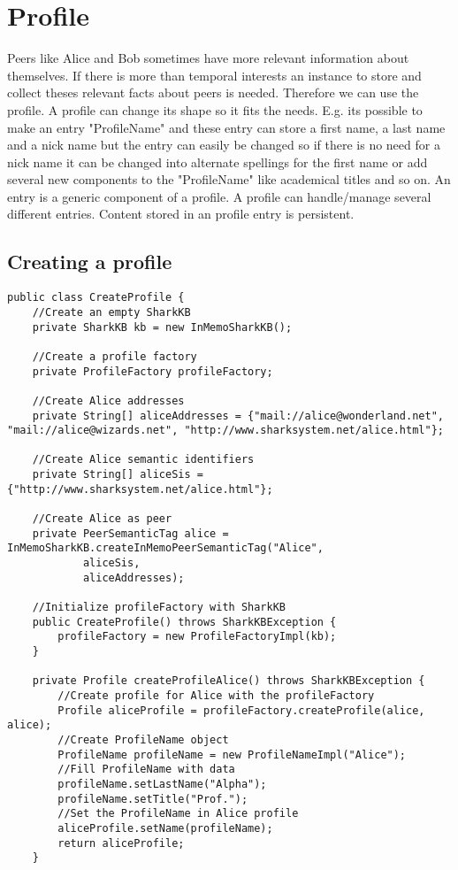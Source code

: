 \section{Profile}
\label{sec:knowledgePorts:Profile}
Peers like Alice and Bob sometimes have more relevant information about themselves. If there is more than temporal interests an instance to store and collect theses relevant facts about peers is needed. Therefore we can use the profile. A profile can change its shape so it fits the needs. E.g. its possible to make an entry "ProfileName" and these entry can store a first name, a last name and a nick name but the entry can easily be changed so if there is no need for a nick name it can be changed into alternate spellings for the first name or add several new components to the "ProfileName" like academical titles and so on. 
An entry is a generic component of a profile. A profile can handle/manage several different entries. Content stored in an profile entry is persistent. 

\subsection{Creating a profile}
\begin{verbatim}
public class CreateProfile {
	//Create an empty SharkKB
    private SharkKB kb = new InMemoSharkKB();
    
    //Create a profile factory
    private ProfileFactory profileFactory;
    
    //Create Alice addresses
    private String[] aliceAddresses = {"mail://alice@wonderland.net", "mail://alice@wizards.net", "http://www.sharksystem.net/alice.html"};
    
    //Create Alice semantic identifiers 
    private String[] aliceSis = {"http://www.sharksystem.net/alice.html"};
    
    //Create Alice as peer
    private PeerSemanticTag alice = InMemoSharkKB.createInMemoPeerSemanticTag("Alice",
            aliceSis,
            aliceAddresses);
            
    //Initialize profileFactory with SharkKB
    public CreateProfile() throws SharkKBException {
        profileFactory = new ProfileFactoryImpl(kb);
    }

    private Profile createProfileAlice() throws SharkKBException {
    	//Create profile for Alice with the profileFactory
        Profile aliceProfile = profileFactory.createProfile(alice, alice);
        //Create ProfileName object
        ProfileName profileName = new ProfileNameImpl("Alice");
		//Fill ProfileName with data
        profileName.setLastName("Alpha");
        profileName.setTitle("Prof.");
		//Set the ProfileName in Alice profile
        aliceProfile.setName(profileName);
        return aliceProfile;
    }
\end{verbatim}

